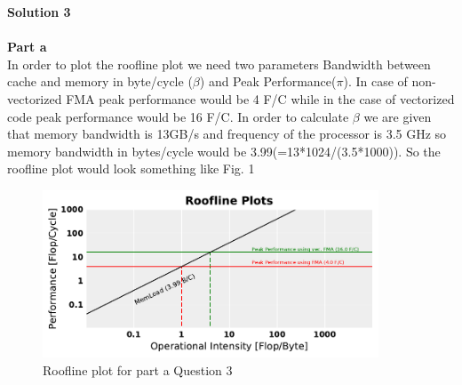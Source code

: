 \documentclass[letterpaper, 11pt]{article}
\begin{document}
\textbf{Solution 3}\\ \\
\textbf{Part a} \\
In order to plot the roofline plot we need two parameters Bandwidth between cache and memory in byte/cycle ($\beta$) and Peak Performance($\pi$). In case of non-vectorized FMA peak performance would be 4 F/C while in the case of vectorized code peak performance would be 16 F/C. In order to calculate $\beta$ we are given that memory bandwidth is 13GB/s and frequency of the processor is 3.5 GHz so memory bandwidth in bytes/cycle would be 3.99(=13*1024/(3.5*1000)). So the roofline plot would look something like Fig. 1
\begin{figure}[h!]
	\centering
    \includegraphics[width=100mm]{basic-rooflinePlot}
    \caption{Roofline plot for part a Question 3}
\end{figure}
\end{document}
